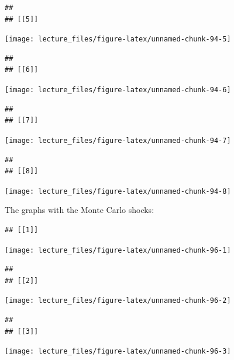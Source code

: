 \documentclass[]{book}
\begin{document}
\begin{verbatim}
## 
## [[5]]
\end{verbatim}

\begin{center}\texttt{[image: lecture\_files/figure-latex/unnamed-chunk-94-5]} \end{center}

\begin{verbatim}
## 
## [[6]]
\end{verbatim}

\begin{center}\texttt{[image: lecture\_files/figure-latex/unnamed-chunk-94-6]} \end{center}

\begin{verbatim}
## 
## [[7]]
\end{verbatim}

\begin{center}\texttt{[image: lecture\_files/figure-latex/unnamed-chunk-94-7]} \end{center}

\begin{verbatim}
## 
## [[8]]
\end{verbatim}

\begin{center}\texttt{[image: lecture\_files/figure-latex/unnamed-chunk-94-8]} \end{center}

The graphs with the Monte Carlo shocks:

\begin{verbatim}
## [[1]]
\end{verbatim}

\begin{center}\texttt{[image: lecture\_files/figure-latex/unnamed-chunk-96-1]} \end{center}

\begin{verbatim}
## 
## [[2]]
\end{verbatim}

\begin{center}\texttt{[image: lecture\_files/figure-latex/unnamed-chunk-96-2]} \end{center}

\begin{verbatim}
## 
## [[3]]
\end{verbatim}

\begin{center}\texttt{[image: lecture\_files/figure-latex/unnamed-chunk-96-3]} \end{center}
\end{document}
